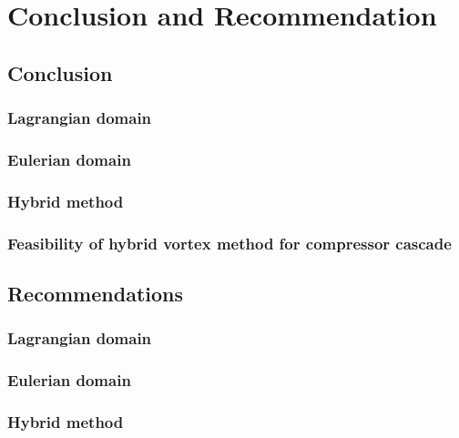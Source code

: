 \chapter{Conclusion and Recommendation}
\label{ch:ConclusionandRecommendation}

\section{Conclusion}

\subsection{Lagrangian domain}

\subsection{Eulerian domain}

\subsection{Hybrid method}

\subsection{Feasibility of hybrid vortex method for compressor cascade}

\section{Recommendations}

\subsection{Lagrangian domain}

\subsection{Eulerian domain}

\subsection{Hybrid method}

%
